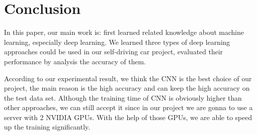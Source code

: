 \documentclass[article]{aaltoseries}
\begin{document}
\section{Conclusion}
\label{sec:conclusion}

In this paper, our main work is: first learned related knowledge about machine learning, especially deep learning. 
We learned three types of deep learning approaches could be used in our self-driving car project, evaluated their
performance by analysis the accuracy of them.

According to our experimental result, we think the CNN is the best choice of our project, the main reason is the high accuracy
and can keep the high accuracy on the test data set. Although the training time of CNN is obviously higher than other
approaches, we can still accept it since in our project we are gonna to use a server with 2 NVIDIA GPUs.
With the help of those GPUs, we are able to speed up the training significantly.





\end{document}
